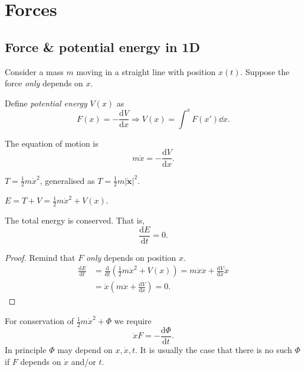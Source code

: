 \section{Forces}

\subsection{Force \& potential energy in 1D}

Consider a mass $m$ moving in a straight line with position $x(t)$. Suppose the force \textit{only} depends on $x$.
\begin{definition}
    Define \textit{potential energy} $ V(x) $ as 
    \[
        F(x) = -\frac{\mathrm{d}V}{\mathrm{d}x} \Longrightarrow V(x) = \int^{x}F(x')\dd x.
    \]
\end{definition}

The equation of motion is
\[
    m \ddot{x}=-\frac{\mathrm{d}V}{\mathrm{d}x} .
\]

\begin{definition}
    $T=\frac{1}{2}m \dot{x}^2$, generalised as $ T=\frac{1}{2}m|\dot{\mathbf{x}}|^2 $. 
\end{definition}
\begin{definition}
    $ E=T+V = \frac{1}{2}m \dot{x}^2+V(x) $.
\end{definition}
\begin{proposition}
    The total energy is conserved. That is, 
    \[
        \frac{\mathrm{d}E}{\mathrm{d}t}=0. 
    \]
\end{proposition}
\begin{proof}
    Remind that $F$ \textit{only} depends on position $x$.
    \begin{align*}
        \frac{\mathrm{d}E}{\mathrm{d}t} &= \frac{\mathrm{d}}{\mathrm{d}t}\left( \frac{1}{2} m \dot{x}^2+V(x) \right) = m \dot{x} \ddot{x} + \frac{\mathrm{d}V}{\mathrm{d}x} \dot{x}\\
        &= \dot{x} \left( m \ddot{x} + \frac{\mathrm{d}V}{\mathrm{d}x}  \right) = 0.
    \end{align*}
\end{proof}

\begin{note}
    For conservation of $ \frac{1}{2} m \dot{x}^2 + \Phi $ we require 
    \[
        \dot{x}F = -\frac{\mathrm{d}\Phi}{\mathrm{d}t}. 
    \]
    In principle $ \Phi $ may depend on $ x, \dot{x}, t $. It is usually the case that there is no such $ \Phi $ if $F$ depends on $ \dot{x} $ and/or $t$.
\end{note}

